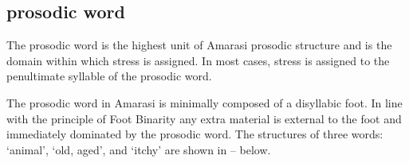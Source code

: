\subsection{prosodic word}\label{sec:PrWd}
The prosodic word is the highest unit of Amarasi prosodic structure
and is the domain within which stress is assigned.
In most cases, stress is assigned to the penultimate syllable of the prosodic word.

The prosodic word in Amarasi is minimally composed of a disyllabic foot.
In line with the principle of Foot Binarity
\citep{pr80,mccpr93,ha94} any extra material is external
to the foot and immediately dominated by the prosodic word.
The structures of three words:  `animal',
 `old, aged', and  `itchy' are
shown in -- below.

